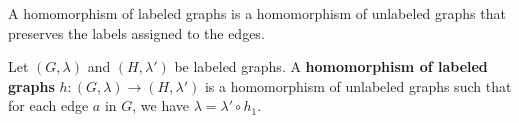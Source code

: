 A homomorphism of labeled graphs is a homomorphism of unlabeled graphs that preserves the labels assigned to the edges.
\begin{definition}
    \label{def:graph:homomorphism}
    Let \( (G,\lambda) \) and \( (H,\lambda') \) be labeled graphs. A \textbf{homomorphism of labeled graphs} \( h:(G,\lambda) \mathop{\rightarrow} (H,\lambda') \) is a homomorphism of unlabeled graphs such that for each edge \( a \) in \( G \), we have \( \lambda \mathop{=} \lambda' \circ h_1 \).
\end{definition}